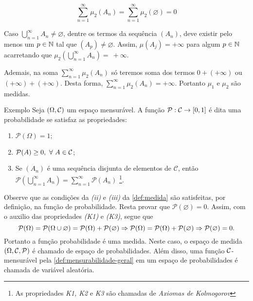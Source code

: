 $$\sum_{n = 1}^\infty \mu_2(A_n) = \sum_{n = 1}^\infty \mu_2(\varnothing) = 0$$

Caso $\displaystyle \bigcup_{n = 1}^\infty A_n  \neq  \varnothing$, dentre os termos da sequência $(A_n)$, deve existir pelo menos um $p \in \operatorname{\mathbb{N}}$ tal que $(A_p) \neq \varnothing$.
Assim, $\mu(A_j) = +\infty$ para algum $p \in \operatorname{\mathbb{N}}$ acarretando que  $\mu_2\left(\displaystyle \bigcup_{n = 1}^\infty A_n\right) =~+\infty$.

Ademais, na soma $\displaystyle \sum_{n = 1}^\infty \mu_2(A_n)$ só teremos soma dos termos $0 + (+ \infty)$ ou $(+\infty) + (+\infty)$.
Desta forma, $\displaystyle \sum_{n = 1}^\infty \mu_2(A_n) = +\infty$.
Portanto $\mu_1$ e $\mu_2$ são medidas.

\begin{env}{Exemplo}
	Seja $(\Omega, \operatorname{\mathcal{C}})$ um espaço mensurável.
	A função $\mathcal{P}:\operatorname{\mathcal{C}} \to [0,1]$ é dita uma probabilidade se satisfaz as propriedades:
	\begin{enumerate}[label* =(\textit{K\arabic*})]
		\item $\mathcal{P}(\Omega) = 1$;
		\item $\mathcal{P}(A) \geq 0,\ \forall\  A \in \operatorname{\mathcal{C}}$;
		\item Se $(A_n)$ é uma sequência disjunta de elementos de  $\mathcal{C}$, então 
		$\displaystyle\mathcal{P}\left(\bigcup_{n = 1}^\infty A_n\right) = \sum_{n = 1}^\infty\mathcal{P}(A_n)$
		\cite[p.11, adaptação nossa]{magalhaes}
		\footnote{As propriedades \textit{K1, K2} e \textit{K3} são chamadas de \textit{Axiomas de Kolmogorov}}.
	\end{enumerate}
\end{env}

Observe que as condições da \textit{(ii)} e \textit{(iii)} da \ref{def:medida} são satisfeitas, por definição, na função de probabilidade.
Resta provar que $\mathcal{P}(\varnothing) = 0$.
Assim, com o auxilio das propriedades \textit{(K1)} e \textit{(K3)}, segue que 
$$
\operatorname{\mathcal{P}}(\Omega)
= 
\operatorname{\mathcal{P}}(\Omega \cup \varnothing)
= 
\operatorname{\mathcal{P}}(\Omega) + \operatorname{\mathcal{P}}(\varnothing)
\Rightarrow
\operatorname{\mathcal{P}}(\Omega)
= 
\operatorname{\mathcal{P}}(\Omega) + \operatorname{\mathcal{P}}(\varnothing)
\Rightarrow
\operatorname{\mathcal{P}}(\varnothing) = 0.
$$
Portanto a função probabilidade é uma medida.
Neste caso, o espaço de medida $(\Omega, \operatorname{\mathcal{C}}, \operatorname{\mathcal{P}})$ é chamado de espaço de probabilidades.
Além disso, uma função $\operatorname{\mathcal{C}}$-mensurável pela \ref{def:mensurabilidade-geral} em um espaço de probabilidades é chamada de variável aleatória.

